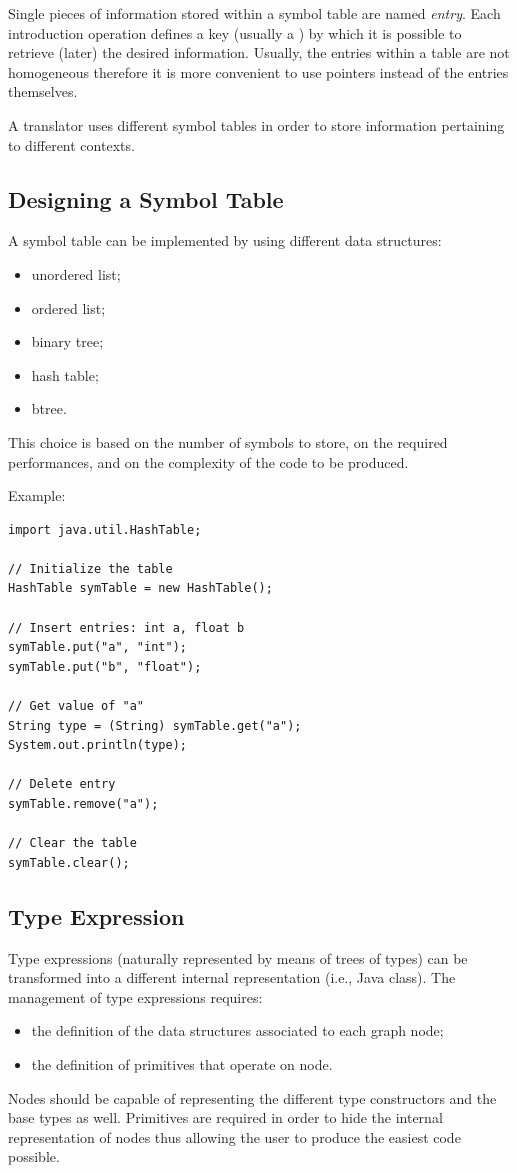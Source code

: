 Single pieces of information stored within a symbol table are named \emph{entry}.
Each introduction operation defines a key (usually a ) by which it is possible to retrieve (later) the desired information.
Usually, the entries within a table are not homogeneous therefore it is more convenient to use pointers instead of the entries themselves.

A translator uses different symbol tables in order to store information pertaining to different contexts.

\subsection{Designing a Symbol Table}
A symbol table can be implemented by using different data structures:
\begin{itemize}
    \item
    unordered list;
    \item
    ordered list;
    \item
    binary tree;
    \item
    hash table;
    \item
    btree.
\end{itemize}
This choice is based on the number of symbols to store, on the required performances, and on the complexity of the code to be produced.

Example:
\begin{lstlisting}[frame=single]
import java.util.HashTable;

// Initialize the table
HashTable symTable = new HashTable();

// Insert entries: int a, float b
symTable.put("a", "int");
symTable.put("b", "float");

// Get value of "a"
String type = (String) symTable.get("a");
System.out.println(type);

// Delete entry
symTable.remove("a");

// Clear the table
symTable.clear();
\end{lstlisting}

\subsection{Type Expression}
Type expressions (naturally represented by means of trees of types) can be transformed into a different internal representation (i.e., Java class).
The management of type expressions requires:
\begin{itemize}
    \item
    the definition of the data structures associated to each graph node;
    \item
    the definition of primitives that operate on node.
\end{itemize}
Nodes should be capable of representing the different type constructors and the base types as well.
Primitives are required in order to hide the internal representation of nodes thus allowing the user to produce the easiest code possible.

